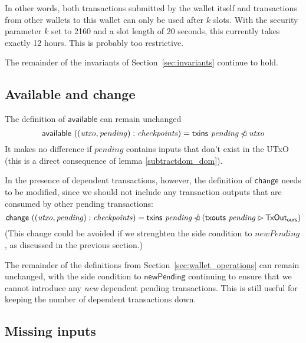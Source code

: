 \documentclass{article}
\newcommand{\restrictdom}{\lhd}
\newcommand{\subtractdom}{\mathbin{\slashed{\restrictdom}}}
\newcommand{\restrictrange}{\rhd}
\begin{document}
In other words, both transactions submitted by the wallet itself and
transactions from other wallets to this wallet can only be used after $k$ slots.
With the security parameter $k$ set to 2160 and a slot length of 20 seconds,
this currently takes exactly 12 hours. This is probably too restrictive.

The remainder of the invariants of Section~\ref{sec:invariants} continue to hold.

\subsection{Available and change}

The definition of $\mathsf{available}$ can remain unchanged
%
\begin{equation}
  \mathsf{available} ~ ((\mathit{utxo}, \mathit{pending}) : \mathit{checkpoints})
= \mathsf{txins} ~ \mathit{pending} \subtractdom \mathit{utxo} \\
\end{equation}
%
It makes no difference if  $\mathit{pending}$ contains
inputs that don't exist in the UTxO (this is a direct consequence of
lemma \eqref{subtractdom_dom}).

In the presence of dependent transactions, however, the definition of
$\mathsf{change}$ needs to be modified, since we should not include any
transaction outputs that are consumed by other pending transactions:
%
\begin{equation*}
  \mathsf{change} ~ ((\mathit{utxo}, \mathit{pending}) : \mathit{checkpoints})
= \mathsf{txins} ~ \mathit{pending} \subtractdom (\mathsf{txouts} ~ \mathit{pending} \restrictrange \mathsf{TxOut_{ours}})
\end{equation*}
%
(This change could be avoided if we strenghten the side condition to
$\mathit{newPending}$, as discussed in the previous section.)

The remainder of the definitions from Section~\ref{sec:wallet_operations} can
remain unchanged, with the side condition to $\mathsf{newPending}$ continuing to
ensure that we cannot introduce any \emph{new} dependent pending transactions.
This is still useful for keeping the number of dependent transactions down.

\subsection{Missing inputs}
\end{document}
